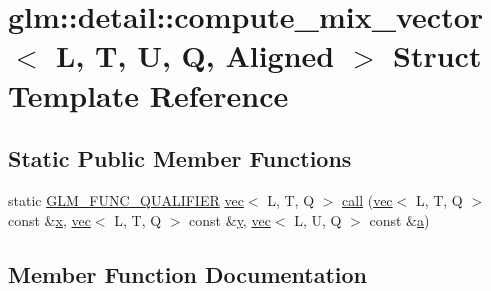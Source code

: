 \hypertarget{structglm_1_1detail_1_1compute__mix__vector}{}\section{glm\+:\+:detail\+:\+:compute\+\_\+mix\+\_\+vector$<$ L, T, U, Q, Aligned $>$ Struct Template Reference}
\label{structglm_1_1detail_1_1compute__mix__vector}
\subsection*{Static Public Member Functions}
\begin{DoxyCompactItemize}
\item 
static \hyperlink{setup_8hpp_a33fdea6f91c5f834105f7415e2a64407}{G\+L\+M\+\_\+\+F\+U\+N\+C\+\_\+\+Q\+U\+A\+L\+I\+F\+I\+ER} \hyperlink{structglm_1_1vec}{vec}$<$ L, T, Q $>$ \hyperlink{structglm_1_1detail_1_1compute__mix__vector_ac5a0714c7ca8bc2143989e9f8db6b633}{call} (\hyperlink{structglm_1_1vec}{vec}$<$ L, T, Q $>$ const \&\hyperlink{_s_d_l__opengl_8h_ad0e63d0edcdbd3d79554076bf309fd47}{x}, \hyperlink{structglm_1_1vec}{vec}$<$ L, T, Q $>$ const \&\hyperlink{_s_d_l__opengl_8h_a1675d9d7bb68e1657ff028643b4037e3}{y}, \hyperlink{structglm_1_1vec}{vec}$<$ L, U, Q $>$ const \&\hyperlink{_s_d_l__opengl__glext_8h_a3309789fc188587d666cda5ece79cf82}{a})
\end{DoxyCompactItemize}


\subsection{Member Function Documentation}
\mbox{\label{structglm_1_1detail_1_1compute__mix__vector_ac5a0714c7ca8bc2143989e9f8db6b633}} 

